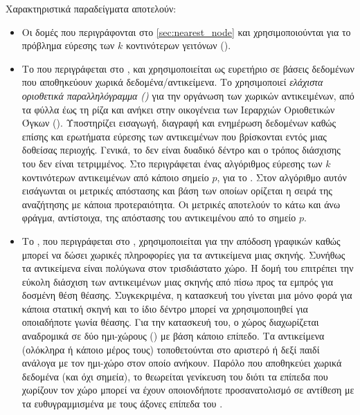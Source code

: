 Χαρακτηριστικά παραδείγματα αποτελούν:
\begin{itemize}
    \item Οι δομές  που 
    περιγράφονται στο \ref{sec:nearest_node} και χρησιμοποιούνται 
    για το πρόβλημα εύρεσης των $k$ κοντινότερων γειτόνων (). 

    \item Το  που περιγράφεται στο \cite{guttman1984r}, 
    και χρησιμοποιείται ως ευρετήριο σε βάσεις δεδομένων που αποθηκεύουν χωρικά 
    δεδομένα/αντικείμενα.
    Το  χρησιμοποιεί \textit{ελάχιστα οριοθετικά παραλληλόγραμμα ()}
    για την οργάνωση των χωρικών αντικειμένων, από τα φύλλα έως τη ρίζα και ανήκει 
    στην οικογένεια των Ιεραρχιών Οριοθετικών Όγκων ().
    Υποστηρίζει εισαγωγή, διαγραφή και ενημέρωση δεδομένων καθώς επίσης 
    και ερωτήματα εύρεσης των αντικειμένων που βρίσκονται εντός μιας δοθείσας περιοχής. 
    Γενικά, το  δεν είναι δυαδικό δέντρο και ο τρόπος διάσχισης του 
    δεν είναι τετριμμένος.
    Στο \cite{roussopoulos1995nearest} περιγράφεται ένας αλγόριθμος 
    εύρεσης των $k$ κοντινότερων αντικειμένων από κάποιο σημείο $p$, για το .
    Στον αλγόριθμο αυτόν εισάγωνται οι μετρικές απόστασης \textit{}
    και \textit{} βάση των οποίων ορίζεται η σειρά της αναζήτησης 
    με κάποια προτεραιότητα.
    Οι μετρικές αποτελούν το κάτω και άνω φράγμα, αντίστοιχα, της απόστασης του 
    αντικειμένου από το σημείο $p$.

    \item Το , που περιγράφεται στο \cite{fuchs1980visible},
    χρησιμοποιείται για την απόδοση γραφικών καθώς μπορεί να δώσει χωρικές πληροφορίες 
    για τα αντικείμενα μιας σκηνής. 
    Συνήθως τα αντικείμενα είναι πολύγωνα στον τρισδιάστατο χώρο.
    Η δομή του επιτρέπει την εύκολη διάσχιση των αντικειμένων μιας σκηνής από πίσω προς 
    τα εμπρός για δοσμένη θέση θέασης.
    Συγκεκριμένα, η κατασκευή του γίνεται μια μόνο φορά για κάποια στατική σκηνή 
    και το ίδιο δέντρο μπορεί να χρησιμοποιηθεί για οποιαδήποτε γωνία θέασης.
    Για την κατασκευή του, ο χώρος διαχωρίζεται αναδρομικά 
    σε δύο ημι-χώρους () με βάση κάποιο επίπεδο.
    Τα αντικείμενα (ολόκληρα ή κάποιο μέρος τους) τοποθετούνται στο αριστερό ή δεξί
    παιδί ανάλογα με τον ημι-χώρο στον οποίο ανήκουν.
    Παρόλο που αποθηκεύει χωρικά δεδομένα (και όχι σημεία), το  
    θεωρείται γενίκευση του  διότι τα επίπεδα που χωρίζουν 
    τον χώρο μπορεί να έχουν οποιονδήποτε προσανατολισμό σε αντίθεση 
    με τα ευθυγραμμισμένα με τους άξονες επίπεδα του .


\end{itemize}
